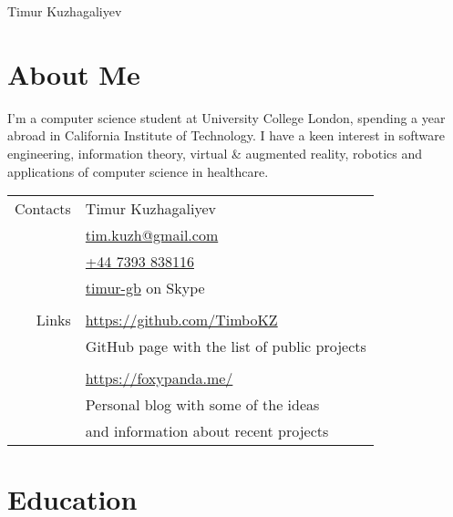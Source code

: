 \documentclass{article}
\begin{document}
\begin{center}
   \huge{Timur Kuzhagaliyev}
\end{center}

\thispagestyle{references}

\begin{multicols}{2}

\section*{\normalfont About Me}
I'm a computer science student at University College London, spending a year abroad in California Institute of Technology. I have a keen interest in software engineering, information theory, virtual \& augmented reality, robotics and applications of computer science in healthcare.

\begin{tabular}{ r l }
 \\ Contacts & Timur Kuzhagaliyev \\ 
 & \href{mailto:tim.kuzh@gmail.com}{tim.kuzh@gmail.com}\\
 & \href{tel:+44 7393 838116}{+44 7393 838116}\\
 & \href{skype:timur-gb}{timur-gb} on Skype\\\\
 Links & \href{https://github.com/TimboKZ}{https://github.com/TimboKZ}\\ 
 & GitHub page with the list of public projects\\\\
 & \href{https://foxypanda.me/}{https://foxypanda.me/}\\ 
 & Personal blog with some of the ideas\\
 & and information about recent projects\\
 \end{tabular}

\section*{\normalfont Education}


\end{multicols}
\end{document}
